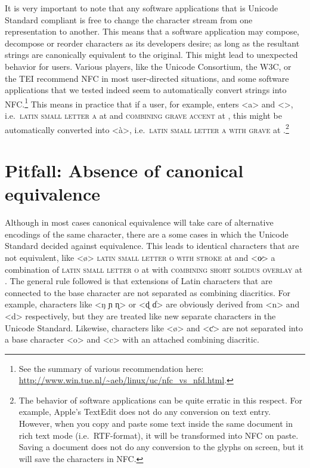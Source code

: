 It is very important to note that any software applications that is Unicode
Standard compliant is free to change the character stream from one
representation to another. This means that a software application may compose,
decompose or reorder characters as its developers desire; as long as the
resultant strings are canonically equivalent to the original. This might lead to
unexpected behavior for users. Various players, like the Unicode Consortium, the
W{\large 3}C, or the TEI recommend NFC in most user-directed situations, and
some software applications that we tested indeed seem to automatically convert
strings into NFC.\footnote{See the summary of various recommendation here:
\url{http://www.win.tue.nl/~aeb/linux/uc/nfc_vs_nfd.html}.} This means in
practice that if a user, for example, enters <a> and <>, i.e.~\textsc{latin
small letter a} at  and \textsc{combining grave accent} at ,
this might be automatically converted into <à>, i.e.~\textsc{latin small letter
a with grave} at .\footnote{The behavior of software applications can
be quite erratic in this respect. For example, Apple's TextEdit does not do any
conversion on text entry. However, when you copy and paste some text inside the
same document in rich text mode (i.e.~RTF-format), it will be transformed into
NFC on paste. Saving a document does not do any conversion to the glyphs on
screen, but it will save the characters in NFC.}

\section{Pitfall: Absence of canonical equivalence}
\label{pitfall-absence-of-equivalence}

Although in most cases canonical equivalence will take care of alternative
encodings of the same character, there are a some cases in which the Unicode
Standard decided against equivalence. This leads to identical characters that
are not equivalent, like <ø> \textsc{latin small letter o with stroke} at
 and <o̷> a combination of \textsc{latin small letter o} at 
with \textsc{combining short solidus overlay} at .
The general rule followed is that extensions of Latin characters that are
connected to the base character are not separated as combining diacritics. For
example, characters like <ŋ ɲ ɳ> or <ɖ ɗ> are obviously derived from <n> and <d>
respectively, but they are treated like new separate characters in the Unicode
Standard. Likewise, characters like <ø> and <ƈ> are not separated into a base 
character <o> and <c> with an attached combining diacritic.

